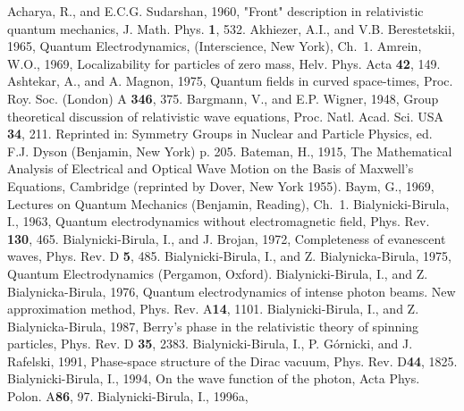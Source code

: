 \documentclass[11pt]{article}
\begin{document}
\begin{thebibliography}{References}
 Acharya, R., and E.C.G.
Sudarshan, 1960, "Front" description in relativistic quantum mechanics, J.
Math. Phys. {\bf 1}, 532.
 Akhiezer, A.I., and V.B.
Berestetskii, 1965, Quantum Electrodynamics, (Interscience, New York),
Ch.~1.
 Amrein, W.O., 1969, Localizability for
particles of zero mass, Helv. Phys. Acta {\bf 42}, 149.
 Ashtekar, A., and A. Magnon,
1975, Quantum fields in curved space-times, Proc. Roy. Soc. (London) A{\bf
346}, 375.
 Bargmann, V., and E.P. Wigner,
1948, Group theoretical discussion of relativistic wave equations, Proc.
Natl. Acad. Sci. USA {\bf 34}, 211. Reprinted in: Symmetry Groups in Nuclear
and Particle Physics, ed. F.J. Dyson (Benjamin, New York) p. 205.
 Bateman, H., 1915, The Mathematical
Analysis of Electrical and Optical Wave Motion on the Basis of Maxwell's
Equations, Cambridge (reprinted by Dover, New York 1955).
 Baym, G., 1969, Lectures on Quantum
Mechanics (Benjamin, Reading), Ch.~1.
 Bialynicki-Birula, I., 1963,
Quantum electrodynamics without electromagnetic field, Phys. Rev. {\bf 130},
465.
 Bialynicki-Birula,
I., and J. Brojan, 1972, Completeness of evanescent waves, Phys. Rev. D{\bf
5}, 485.
Bialynicki-Birula, I., and Z. Bialynicka-Birula, 1975, Quantum
Electrodynamics (Pergamon, Oxford).
Bialynicki-Birula, I., and Z. Bialynicka-Birula, 1976, Quantum
electrodynamics of intense photon beams. New approximation method, Phys.
Rev. A{\bf 14}, 1101.
Bialynicki-Birula, I., and Z. Bialynicka-Birula, 1987, Berry's phase in the
relativistic theory of spinning particles, Phys. Rev. D {\bf 35}, 2383.
Bialynicki-Birula, I., P. G\'ornicki, and J. Rafelski, 1991, Phase-space
structure of the Dirac vacuum, Phys. Rev. D{\bf 44}, 1825.
 Bialynicki-Birula, I., 1994, On
the wave function of the photon, Acta Phys. Polon. A{\bf 86}, 97.
 Bialynicki-Birula, I., 1996a,

\end{thebibliography}
\end{document}
